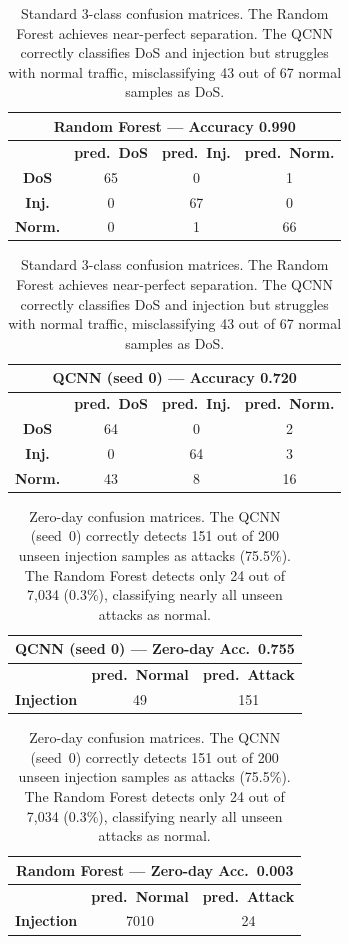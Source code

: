 \begin{table}[ht]
\centering
\small
\begin{tabular}{c|ccc}
    \multicolumn{4}{c}{\textbf{Random Forest} --- Accuracy 0.990} \\
    \toprule
     & \textbf{pred.\ DoS} & \textbf{pred.\ Inj.} & \textbf{pred.\ Norm.} \\
    \midrule
    \textbf{DoS}    & 65 &  0 &  1 \\
    \textbf{Inj.}   &  0 & 67 &  0 \\
    \textbf{Norm.}   &  0 &  1 & 66 \\
    \bottomrule
\end{tabular}
\hspace{0.8cm}
\begin{tabular}{c|ccc}
    \multicolumn{4}{c}{\textbf{QCNN (seed 0)} --- Accuracy 0.720} \\
    \toprule
     & \textbf{pred.\ DoS} & \textbf{pred.\ Inj.} & \textbf{pred.\ Norm.} \\
    \midrule
    \textbf{DoS}    & 64 &  0 &  2 \\
    \textbf{Inj.}   &  0 & 64 &  3 \\
    \textbf{Norm.}   & 43 &  8 & 16 \\
    \bottomrule
\end{tabular}
\caption{Standard 3-class confusion matrices. The Random Forest achieves near-perfect separation. The QCNN correctly classifies DoS and injection but struggles with normal traffic, misclassifying 43 out of 67 normal samples as DoS.}
\label{tab:cm_std_annex}
\end{table}

\begin{table}[ht]
\centering
\small
\begin{tabular}{c|cc}
    \multicolumn{3}{c}{\textbf{QCNN (seed 0)} --- Zero-day Acc.\ 0.755} \\
    \toprule
     & \textbf{pred.\ Normal} & \textbf{pred.\ Attack} \\
    \midrule
    \textbf{Injection}  & 49 & 151 \\
    \bottomrule
\end{tabular}
\hspace{0.8cm}
\begin{tabular}{c|cc}
    \multicolumn{3}{c}{\textbf{Random Forest} --- Zero-day Acc.\ 0.003} \\
    \toprule
     & \textbf{pred.\ Normal} & \textbf{pred.\ Attack} \\
    \midrule
    \textbf{Injection}  & 7010 & 24 \\
    \bottomrule
\end{tabular}
\caption{Zero-day confusion matrices. The QCNN (seed~0) correctly detects 151 out of 200 unseen injection samples as attacks (75.5\%). The Random Forest detects only 24 out of 7,034 (0.3\%), classifying nearly all unseen attacks as normal.}
\label{tab:cm_zd_annex}
\end{table}

